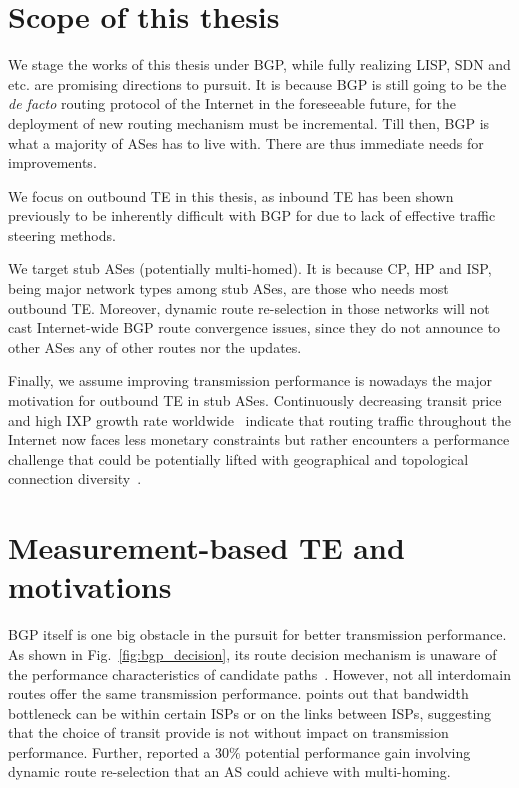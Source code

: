 \section{Scope of this thesis}
We stage the works of this thesis under BGP, while fully realizing \ac{LISP}, \ac{SDN} and etc. are promising directions to pursuit.
It is because BGP is still going to be the \textit{de facto} routing protocol of the Internet in the foreseeable future, for the deployment of new routing mechanism must be incremental.
Till then,  BGP is what a majority of ASes has to live with. 
There are thus immediate needs for improvements.

We focus on outbound TE in this thesis, as inbound TE has been shown previously to be inherently difficult with BGP for due to lack of effective traffic steering methods.

We target stub ASes (potentially multi-homed).
It is because \ac{CP}, \ac{HP} and \ac{ISP}, being major network types among stub ASes, are those who needs most outbound TE.
Moreover, dynamic route re-selection in those networks will not cast Internet-wide BGP route convergence issues, since they do not announce to other ASes any of other routes nor the updates.

Finally, we assume improving transmission performance is nowadays the major motivation for outbound TE in stub ASes.
Continuously decreasing transit price~\cite{transitprice, drpeering} and high \ac{IXP} growth rate worldwide~\cite{pchixp} indicate that routing traffic throughout the Internet now faces less monetary constraints but rather encounters a performance challenge that could be potentially lifted with geographical and topological connection diversity~\cite{Chiu2015}.


\section{Measurement-based TE and motivations}

BGP itself is one big obstacle in the pursuit for better transmission performance.
As shown in Fig.~\ref{fig:bgp_decision}, its route decision mechanism is unaware of the performance characteristics of candidate paths~\cite{Yannuzzi2005}.
However, not all interdomain routes offer the same transmission performance. \citet{Akella2003} points out that bandwidth bottleneck can be within certain \acp{ISP} or on the links between \acp{ISP}, suggesting that the choice of transit provide is not without impact on transmission performance.
Further, \citet{Akella2003a} reported a $30\%$ potential performance gain involving dynamic route re-selection that an AS could achieve with multi-homing.

